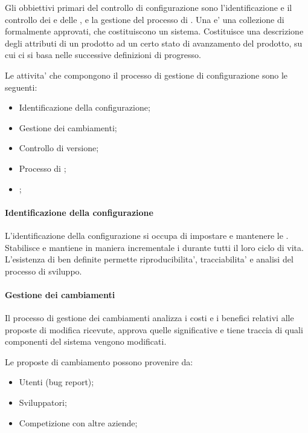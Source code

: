
Gli obbiettivi primari del controllo di configurazione sono l'identificazione e il controllo dei  e delle , e la gestione del processo di . Una  e' una collezione di  formalmente approvati, che costituiscono un sistema. Costituisce una descrizione degli attributi di un prodotto ad un certo stato di avanzamento del prodotto, su cui ci si basa nelle successive definizioni di progresso.

Le attivita' che compongono il processo di gestione di configurazione sono le seguenti:
\begin{itemize}
	\item Identificazione della configurazione;
	\item Gestione dei cambiamenti;
	\item Controllo di versione;
	\item Processo di ;
	\item {};
\end{itemize}

\paragraph{Identificazione della configurazione}
L'identificazione della configurazione si occupa di impostare e mantenere le . Stabilisce e mantiene in maniera incrementale i  durante tutti il loro ciclo di vita. L'esistenza di  ben definite permette riproducibilita', tracciabilita' e analisi del processo di sviluppo.

\paragraph{Gestione dei cambiamenti}
Il processo di gestione dei cambiamenti analizza i costi e i benefici relativi alle proposte di modifica ricevute, approva quelle significative e tiene traccia di quali componenti del sistema vengono modificati.

Le proposte di cambiamento possono provenire da:
\begin{itemize}
	\item Utenti (bug report);
	\item Sviluppatori;
	\item Competizione con altre aziende;
\end{itemize}

